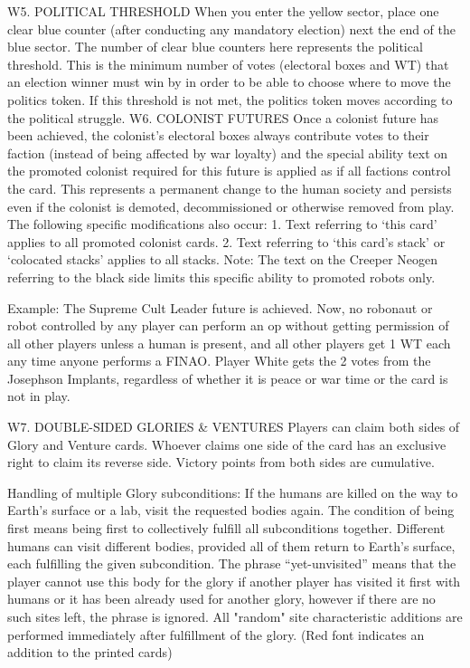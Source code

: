 \documentclass[a4paper]{book}
\begin{document}
W5. POLITICAL THRESHOLD
When you enter the yellow sector, place one clear blue counter (after conducting any mandatory election) next the end of the blue sector. The number of clear blue counters here represents the political threshold. This is the minimum number of votes (electoral boxes and WT) that an election winner must win by in order to be able to choose where to move the politics token. If this threshold is not met, the politics token moves according to the political struggle.
W6. COLONIST FUTURES
Once a colonist future has been achieved, the colonist’s electoral boxes always contribute votes to their faction (instead of being affected by war loyalty) and the special ability text on the promoted colonist required for this future is applied as if all factions control the card. This represents a permanent change to the human society and persists even if the colonist is demoted, decommissioned or otherwise removed from play. The following specific modifications also occur:
1. Text referring to ‘this card’ applies to all promoted colonist cards.
2. Text referring to ‘this card’s stack’ or ‘colocated stacks’ applies to all stacks.
Note: The text on the Creeper Neogen referring to the black side limits this specific ability to promoted robots only.

Example: The Supreme Cult Leader future is achieved. Now, no robonaut or robot controlled by any player can perform an op without getting permission of all other players unless a human is present, and all other players get 1 WT each any time anyone performs a FINAO. Player White gets the 2 votes from the Josephson Implants, regardless of whether it is peace or war time or the card is not in play.

W7. DOUBLE-SIDED GLORIES \& VENTURES
Players can claim both sides of Glory and Venture cards. Whoever claims one side of the card has an exclusive right to claim its reverse side. Victory points from both sides are cumulative.

Handling of multiple Glory subconditions: If the humans are killed on the way to Earth’s surface or a lab, visit the requested bodies again. The condition of being first means being first to collectively fulfill all subconditions together. Different humans can visit different bodies, provided all of them return to Earth’s surface, each fulfilling the given subcondition. The phrase “yet-unvisited” means that the player cannot use this body for the glory if another player has visited it first with humans or it has been already used for another glory, however if there are no such sites left, the phrase is ignored. All "random" site characteristic additions are performed immediately after fulfillment of the glory.
 (Red font indicates an addition to the printed cards)
\end{document}
